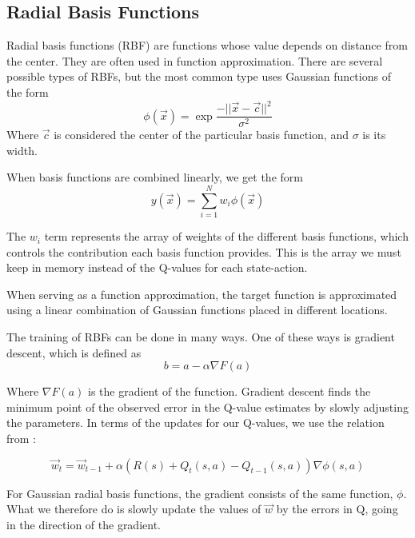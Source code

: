 \documentclass[12pt, letterpaper]{article}
\begin{document}
\subsection{Radial Basis Functions}
Radial basis functions (RBF) are functions whose value depends on distance from the center\cite{rbfWikipedia}. They are often used in function approximation. There are several possible types of RBFs, but the most common type uses Gaussian functions of the form 
\begin{equation}
    \phi(\vec{x}) = \exp {\frac{-||\vec{x}-\vec{c}||^2}{\sigma^2}}
\end{equation}
Where $\vec{c}$ is considered the center of the particular basis function, and $\sigma$ is its width.

When basis functions are combined linearly, we get the form
\begin{equation}
    y(\vec{x}) = \sum_{i=1}^N w_i \phi(\vec{x})
\end{equation}

The $w_i$ term represents the array of weights of the different basis functions, which controls the contribution each basis function provides. This is the array we must keep in memory instead of the Q-values for each state-action.  

When serving as a function approximation, the target function is approximated using a linear combination of Gaussian functions placed in different locations.

The training of RBFs can be done in many ways. One of these ways is gradient descent, which is defined as
\begin{equation}
    b = a - \alpha \nabla F(a)
\end{equation}

Where $\nabla F(a)$ is the gradient of the function. Gradient descent finds the minimum point of the observed error in the Q-value estimates by slowly adjusting the parameters. In terms of the updates for our Q-values, we use the relation from \cite{russell10artificial}:

\begin{equation}
    \vec w_{t} = \vec w_{t-1} + \alpha(R(s) + Q_t(s, a) - Q_{t-1}(s, a)) \nabla \phi(s, a)
\end{equation}

For Gaussian radial basis functions, the gradient consists of the same function, $\phi$. What we therefore do is slowly update the values of $\vec w$ by the errors in Q, going in the direction of the gradient.
\end{document}

